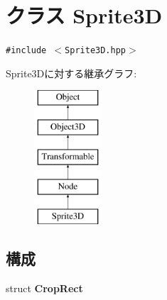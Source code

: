\hypertarget{classm3g_1_1Sprite3D}{
\section{クラス Sprite3D}
\label{classm3g_1_1Sprite3D}
}
{\tt \#include $<$Sprite3D.hpp$>$}

Sprite3Dに対する継承グラフ:\begin{figure}[H]
\begin{center}
\leavevmode
\includegraphics[height=5cm]{classm3g_1_1Sprite3D}
\end{center}
\end{figure}
\subsection*{構成}
\begin{CompactItemize}
\item 
struct \textbf{CropRect}
\end{CompactItemize}
